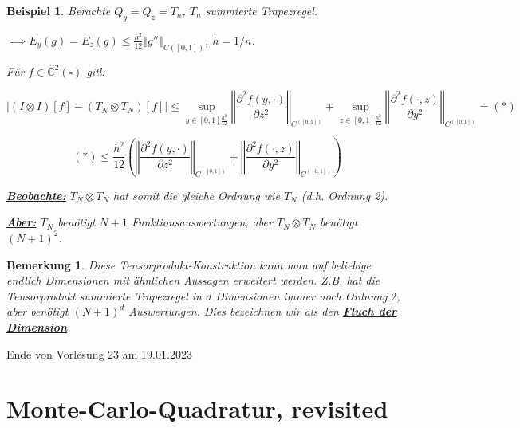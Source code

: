 \documentclass{book}
\newtheorem{remark}[algorithm]{Bemerkung}
\newtheorem{example}[algorithm]{Beispiel}
\def\C{\mathbb{C}}
\begin{document}
            \begin{example}\label{b518}
                Berachte $Q_y=Q_z=T_n$,  $T_n$ summierte Trapezregel.

                $\implies E_y(g)=E_z(g)\leq \frac{h^2}{12}\left\Vert g'' \right\Vert_{C([0,1])}$, $h=1/n$.

                Für $f\in\C^2(\square)$ gitl:

                \begin{equation*}
                    \left\vert (I\otimes I)[f]-(T_N\otimes T_N)[f] \right\vert\leq \sup_{y\in[0,1] \frac{h^2}{12}}\left\Vert \frac{\partial^2 f(y,\cdot)}{\partial z^2} \right\Vert_{C^([0,1])}+\sup_{z\in[0,1] \frac{h^2}{12}}\left\Vert \frac{\partial^2 f(\cdot,z)}{\partial y^2} \right\Vert_{C^([0,1])} = (*)
                \end{equation*}

                \begin{equation*}
                    (*) \leq \frac{h^2}{12}\left(\left\Vert \frac{\partial^2 f(y,\cdot)}{\partial z^2} \right\Vert_{C^([0,1])}+\left\Vert \frac{\partial^2 f(\cdot,z)}{\partial y^2} \right\Vert_{C^([0,1])} \right)
                \end{equation*}
                
            \underline{\textbf{Beobachte:}} $T_N\otimes T_N$ hat somit die gleiche Ordnung wie $T_N$ (d.h. Ordnung 2).

            \underline{\textbf{Aber:}} $T_N$ benötigt $N+1$ Funktionsauswertungen, aber $T_N\otimes T_N$ benötigt $(N+1)^2$.
            \end{example}

            \begin{remark}\label{b519}
                Diese Tensorprodukt-Konstruktion kann man auf beliebige endlich Dimensionen mit ähnlichen Aussagen erweitert werden.
                Z.B. hat die Tensorprodukt summierte Trapezregel in $d$ Dimensionen immer noch Ordnung $2$, aber benötigt $(N+1)^d$ Auswertungen. 
                Dies bezeichnen wir als den \underline{\textbf{Fluch der Dimension}}. 
            \end{remark}

            \noindent
            \xrfill[0.7ex]{1pt}Ende von Vorlesung 23 am 19.01.2023\xrfill[0.7ex]{1pt}
            
        \section{Monte-Carlo-Quadratur, revisited}
\end{document}
